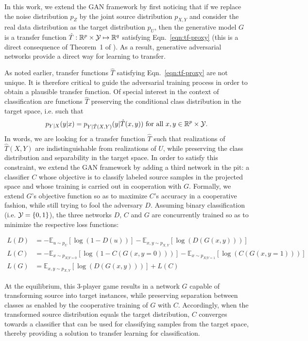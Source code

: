 \documentclass{article}
\theoremstyle{plain}
\begin{document}
In this work, we extend the GAN framework by first noticing that if we replace
the noise distribution $p_Z$ by the joint source distribution $p_{X,Y}$ and
consider the real data distribution as the target distribution $p_U$, then the
generative model $G$ is a transfer function $\hat T : \mathbb{R}^p \times {\cal
Y} \mapsto \mathbb{R}^q$ satisfying Eqn.~\ref{eqn:tf-proxy} (this is a direct
consequence of Theorem~1 of \cite{goodfellow2014generative}). As a result,
generative adversarial networks provide a direct way for learning to transfer.

As noted earlier, transfer functions $\hat T$ satisfying Eqn.~\ref{eqn:tf-proxy}
are not unique. It is therefore critical to guide
the adversarial training process in order to obtain a plausible transfer
function. Of special interest in the context of classification
are functions $\hat T$  preserving the conditional class distribution in the target space,
i.e. such that
\begin{equation}\label{eqn:preservation}
    p_{Y|X}(y|x) = p_{Y|\hat T(X, Y)}(y|\hat T(x, y)) ~\text{for all}~ x, y \in \mathbb{R}^p \times {\cal Y}.
\end{equation}
In words, we are looking for a transfer function $\hat T$ such that realizations
of $\hat T(X,Y)$ are indistinguishable from realizations of $U$, while preserving
the class distribution and separability in the target space.
In order to satisfy this constraint, we extend the GAN framework by
adding a third network in the pit: a classifier $C$ whose objective is to classify
labeled source samples in the projected space and whose training is carried
out in cooperation with $G$.
Formally, we extend $G$'s objective function so as to maximize $C$'s accuracy in a cooperative fashion,
while still trying to fool the adversary $D$. Assuming binary classification (i.e. ${\cal Y} = \{0, 1\}$), the three networks $D$, $C$ and $G$ are
concurrently trained so as to minimize the respective loss functions:

\begin{align}
    L(D) &= -\mathbb{E}_{u \sim p_U} [\log(1 - D(u))] -\mathbb{E}_{x,y \sim p_{X,Y}} [\log(D(G(x, y)))] \\
    L(C) &= -\mathbb{E}_{x \sim p_{X|Y=0}} [\log(1 - C(G(x, y=0)))] -\mathbb{E}_{x \sim p_{X|Y=1}} [\log(C(G(x, y=1)))] \\
    L(G) &= \mathbb{E}_{x,y \sim p_{X,Y}} [\log(D(G(x, y)))] + L(C)
\end{align}

At the equilibrium, this 3-player game results in a network $G$
capable of transforming source into target instances, while preserving
separation between classes as enabled by the cooperative training of $G$ with $C$.
Accordingly, when the transformed source distribution equals the
target distribution, $C$ converges towards a classifier that can be used
for classifying samples from the target space, thereby providing a solution
to transfer learning for classification.
\end{document}
